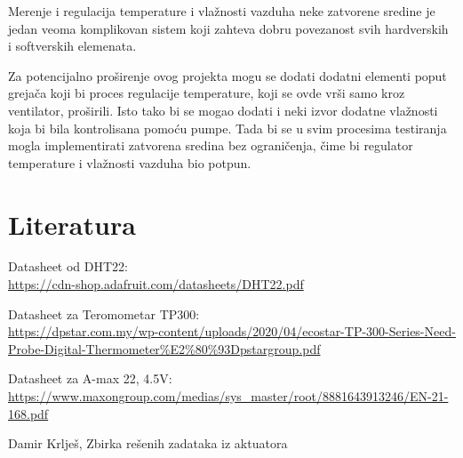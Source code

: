 \documentclass[a4paper, 12pt]{article}
\begin{document}
\vspace{10pt}

Merenje i regulacija temperature i vlažnosti vazduha neke zatvorene sredine je jedan veoma komplikovan sistem koji zahteva dobru povezanost svih hardverskih i softverskih elemenata.

\vspace{10pt}

Za potencijalno proširenje ovog projekta mogu se dodati dodatni elementi poput grejača koji bi proces regulacije temperature, koji se ovde vrši samo kroz ventilator, proširili. Isto tako bi se mogao dodati i neki izvor dodatne vlažnosti koja bi bila kontrolisana pomoću pumpe. Tada bi se u svim procesima testiranja mogla implementirati zatvorena sredina bez ograničenja, čime bi regulator temperature i vlažnosti vazduha bio potpun. 

\pagebreak
\endgroup

\begingroup
\sloppy

\section{Literatura}

\vspace{10pt}

\begin{enumerate}[label={[\arabic*]}, leftmargin=2.5cm]
	\item Datasheet od DHT22: \label{lib:DHT22-datasheet}\\ \url{https://cdn-shop.adafruit.com/datasheets/DHT22.pdf}
	\sloppypar
	\item Datasheet za Teromometar TP300: \label{lib:TP300}\\ \url{https://dpstar.com.my/wp-content/uploads/2020/04/ecostar-TP-300-Series-Need-Probe-Digital-Thermometer\%E2\%80\%93Dpstargroup.pdf}
	\item Datasheet za A-max 22, 4.5V: \label{lib:A-max-22}\\ \url{https://www.maxongroup.com/medias/sys_master/root/8881643913246/EN-21-168.pdf}	
	\item Damir Krlješ, Zbirka rešenih zadataka iz aktuatora \label{lib:workbook}
\end{enumerate}
\renewcommand{\theenumi}{\arabic{enumi}}

\pagebreak
\endgroup
\end{document}
